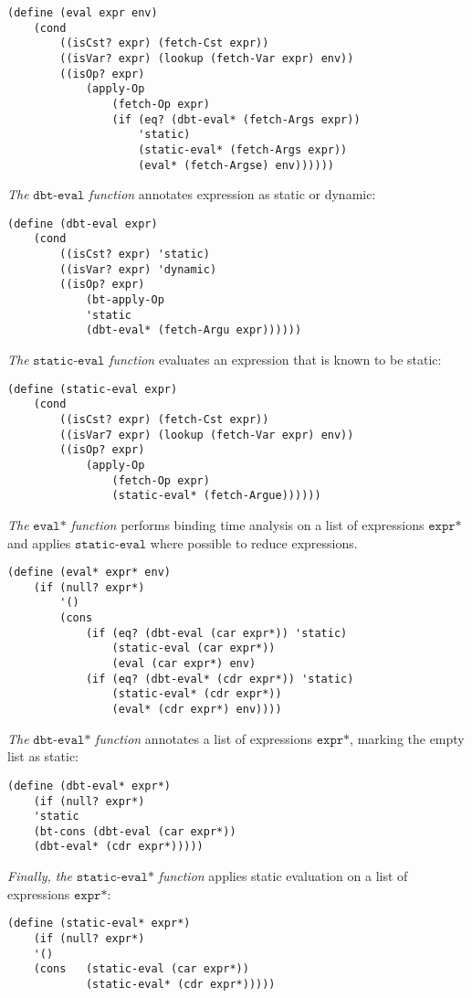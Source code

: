 \documentclass[11pt]{article}
\theoremstyle{definition}
\newcommand{\code}[1]{\texttt{#1}}
\newcommand\tab[1][1cm]{\hspace*{#1}}
\begin{document}
\begin{lstlisting}
(define (eval expr env)
    (cond
        ((isCst? expr) (fetch-Cst expr))
        ((isVar? expr) (lookup (fetch-Var expr) env))
        ((isOp? expr)
            (apply-Op
                (fetch-Op expr)
                (if (eq? (dbt-eval* (fetch-Args expr))
                    'static)
                    (static-eval* (fetch-Args expr))
                    (eval* (fetch-Argse) env))))))
\end{lstlisting}
\tab \textit{The} $\code{dbt-eval}$ \textit{function} annotates expression as static or dynamic:
\begin{lstlisting}
(define (dbt-eval expr)
    (cond
        ((isCst? expr) 'static)
        ((isVar? expr) 'dynamic)
        ((isOp? expr)
            (bt-apply-Op
            'static
            (dbt-eval* (fetch-Argu expr))))))
\end{lstlisting}
\tab \textit{The} $\code{static-eval}$ \textit{function} evaluates an expression that is known to be static:
\begin{lstlisting}
(define (static-eval expr)
    (cond
        ((isCst? expr) (fetch-Cst expr))
        ((isVar7 expr) (lookup (fetch-Var expr) env))
        ((isOp? expr)
            (apply-Op
                (fetch-Op expr)
                (static-eval* (fetch-Argue))))))
\end{lstlisting}
\tab \textit{The} $\code{eval*}$ \textit{function} performs binding time analysis on a list of expressions $\code{expr*}$ and applies $\code{static-eval}$ where possible to reduce expressions. 
\begin{lstlisting}
(define (eval* expr* env)
    (if (null? expr*)
        '()
        (cons
            (if (eq? (dbt-eval (car expr*)) 'static)
                (static-eval (car expr*))
                (eval (car expr*) env)
            (if (eq? (dbt-eval* (cdr expr*)) 'static)
                (static-eval* (cdr expr*))
                (eval* (cdr expr*) env))))
\end{lstlisting}
\tab \textit{The} $\code{dbt-eval*}$ \textit{function} annotates a list of expressions $\code{expr*}$, marking the empty list as static:
\begin{lstlisting}
(define (dbt-eval* expr*)
    (if (null? expr*)
    'static
    (bt-cons (dbt-eval (car expr*))
    (dbt-eval* (cdr expr*)))))
\end{lstlisting}
\tab \textit{Finally, the} $\code{static-eval*}$ \textit{function} applies static evaluation on a list of expressions $\code{expr*}$:
\begin{lstlisting}
(define (static-eval* expr*)
    (if (null? expr*)
    '()
    (cons   (static-eval (car expr*))
            (static-eval* (cdr expr*)))))
\end{lstlisting}
\end{document}
